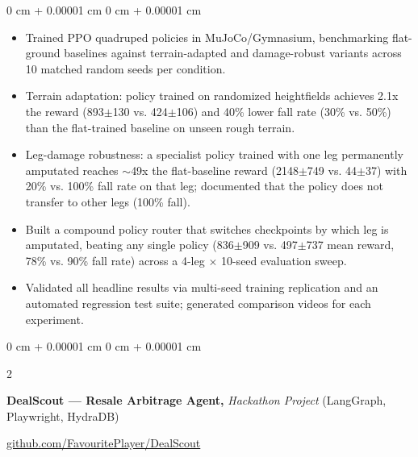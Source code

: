 \documentclass[10pt, letterpaper]{article}
\newenvironment{highlights}{
    \begin{itemize}[
        topsep=0.3 cm,
        parsep=0.05 cm,
        partopsep=0pt,
        itemsep=0pt,
        leftmargin=0 cm + 10pt
    ]
}{
    \end{itemize}
} %
\newenvironment{onecolentry}{
    \begin{adjustwidth}{
        0 cm + 0.00001 cm
    }{
        0 cm + 0.00001 cm
    }
}{
    \end{adjustwidth}
} %
\newenvironment{extendedtwocolentry}[2][]{
    \onecolentry
    \def\secondColumn{#2}
    \setcolumnwidth{\fill, 8 cm}
    \begin{paracol}{2}
}{
    \switchcolumn \raggedleft \secondColumn
    \end{paracol}
    \endonecolentry
}
\begin{document}
        \vspace{0.07 cm}
        \begin{onecolentry}
            \begin{highlights}
                \item Trained PPO quadruped policies in MuJoCo/Gymnasium, benchmarking flat-ground baselines against terrain-adapted and damage-robust variants across 10 matched random seeds per condition.
                \item Terrain adaptation: policy trained on randomized heightfields achieves 2.1x the reward (893$\pm$130 vs. 424$\pm$106) and 40\% lower fall rate (30\% vs. 50\%) than the flat-trained baseline on unseen rough terrain.
                \item Leg-damage robustness: a specialist policy trained with one leg permanently amputated reaches $\sim$49x the flat-baseline reward (2148$\pm$749 vs. 44$\pm$37) with 20\% vs. 100\% fall rate on that leg; documented that the policy does not transfer to other legs (100\% fall).
                \item Built a compound policy router that switches checkpoints by which leg is amputated, beating any single policy (836$\pm$909 vs. 497$\pm$737 mean reward, 78\% vs. 90\% fall rate) across a 4-leg $\times$ 10-seed evaluation sweep.
                \item Validated all headline results via multi-seed training replication and an automated regression test suite; generated comparison videos for each experiment.
            \end{highlights}
        \end{onecolentry}

        \begin{extendedtwocolentry}{
            \href{https://github.com/FavouritePlayer/DealScout}{github.com/FavouritePlayer/DealScout}
        }
            \textbf{DealScout — Resale Arbitrage Agent,} \textit{Hackathon Project} (LangGraph, Playwright, HydraDB)
        \end{extendedtwocolentry}
\end{document}
